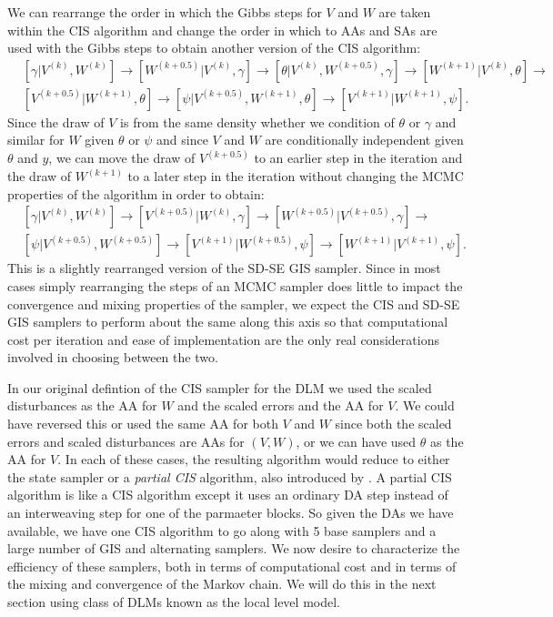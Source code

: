 \documentclass[12pt]{article}
\begin{document}
We can rearrange the order in which the Gibbs steps for $V$ and $W$ are taken within the CIS algorithm and change the order in which to AAs and SAs are used with the Gibbs steps to obtain another version of the CIS algorithm:
\begin{align*}
&[\gamma|V^{(k)},W^{(k)}] \to [W^{(k+0.5)}|V^{(k)},\gamma] \to [\theta|V^{(k)},W^{(k+0.5)},\gamma] \to [W^{(k+1)}|V^{(k)},\theta]\to \\
&[V^{(k+0.5)}|W^{(k+1)},\theta] \to [\psi|V^{(k+0.5)},W^{(k+1)},\theta] \to [V^{(k+1)}|W^{(k+1)},\psi].
\end{align*}
Since the draw of $V$ is from the same density whether we condition of $\theta$ or $\gamma$ and similar for $W$ given $\theta$ or $\psi$ and since $V$ and $W$ are conditionally independent given $\theta$ and $y$, we can move the draw of $V^{(k+0.5)}$ to an earlier step in the iteration and the draw of $W^{(k+1)}$ to a later step in the iteration without changing the MCMC properties of the algorithm in order to obtain:
\begin{align*}
&[\gamma|V^{(k)},W^{(k)}] \to [V^{(k+0.5)}|W^{(k)},\gamma] \to[W^{(k+0.5)}|V^{(k+0.5)},\gamma] \to \\
&[\psi|V^{(k+0.5)},W^{(k+0.5)}]\to [V^{(k+1)}|W^{(k+0.5)},\psi]\to [W^{(k+1)}|V^{(k+1)},\psi].
\end{align*}
This is a slightly rearranged version of the SD-SE GIS sampler. Since in most cases simply rearranging the steps of an MCMC sampler does little to impact the convergence and mixing properties of the sampler, we expect the CIS and SD-SE GIS samplers to perform about the same along this axis so that computational cost per iteration and ease of implementation are the only real considerations involved in choosing between the two.

In our original defintion of the CIS sampler for the DLM we used the scaled disturbances as the AA for $W$ and the scaled errors and the AA for $V$. We could have reversed this or used the same AA for both $V$ and $W$ since both the scaled errors and scaled disturbances are AAs for $(V,W)$, or we can have used $\theta$ as the AA for $V$. In each of these cases, the resulting algorithm would reduce to either the state sampler or a {\it partial CIS} algorithm, also introduced by \citet{yu2011center}. A partial CIS algorithm is like a CIS algorithm except it uses an ordinary DA step instead of an interweaving step for one of the parmaeter blocks. So given the DAs we have available, we have one CIS algorithm to go along with 5 base samplers and a large number of GIS and alternating samplers. We now desire to characterize the efficiency of these samplers, both in terms of computational cost and in terms of the mixing and convergence of the Markov chain. We will do this in the next section using class of DLMs known as the local level model.
\end{document}
